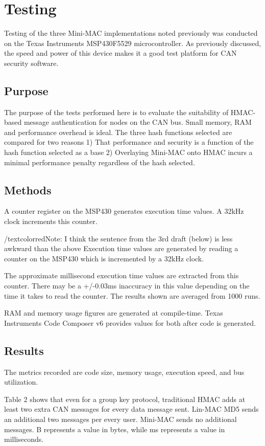 \section{Testing}
Testing of the three Mini-MAC implementations noted previously was conducted on the Texas Instruments MSP430F5529 microcontroller. As previously discussed, the speed and power of this device makes it a good test platform for CAN security software.

\subsection{Purpose}

The purpose of the tests performed here is to evaluate the suitability of HMAC-based message authentication for nodes on the CAN bus. Small memory, RAM and performance overhead is ideal. The three hash functions selected are compared for two reasons 1) That performance and security is a function of the hash function selected as a base 2) Overlaying Mini-MAC onto HMAC incurs a minimal performance penalty regardless of the hash selected.

\subsection{Methods}
A counter register on the MSP430 generates execution time values. A 32kHz clock increments this counter.

/textcolor{red}{Note: I think the sentence from the 3rd draft (below) is less awkward than the above}
Execution time values are generated by reading a counter on the MSP430 which is incremented by a 32kHz clock. 

The approximate millisecond execution time values are extracted from this counter. There may be a +/-0.03ms inaccuracy in this value depending on the time it takes to read the counter. The results shown are averaged from 1000 runs.

RAM and memory usage figures are generated at compile-time. Texas Instruments Code Composer v6 provides values for both after code is generated.

\subsection{Results}
The metrics recorded are code size, memory usage, execution speed, and bus utilization. 

Table 2 shows that even for a group key protocol, traditional HMAC adds at least two extra CAN messages for every data message sent. Lin-MAC MD5 sends an additional two messages per every user. Mini-MAC sends no additional messages. B represents a value in bytes, while ms represents a value in milliseconds.
	
